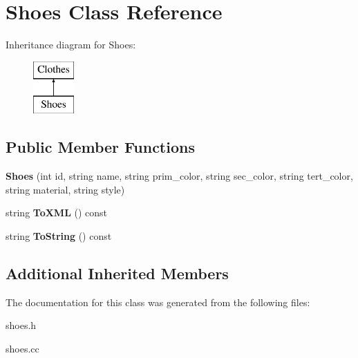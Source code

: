 \hypertarget{classShoes}{}\section{Shoes Class Reference}
\label{classShoes}
Inheritance diagram for Shoes\+:\begin{figure}[H]
\begin{center}
\leavevmode
\includegraphics[height=2.000000cm]{classShoes}
\end{center}
\end{figure}
\subsection*{Public Member Functions}
\begin{DoxyCompactItemize}
\item 
\mbox{\label{classShoes_a4f38fcd11c63cf3256c9688cf1bd19b3}} 
{\bfseries Shoes} (int id, string name, string prim\+\_\+color, string sec\+\_\+color, string tert\+\_\+color, string material, string style)
\item 
\mbox{\label{classShoes_acf6f049aa995a189b0f892f86defeefd}} 
string {\bfseries To\+X\+ML} () const
\item 
\mbox{\label{classShoes_a9b1bcc00ec7ef920d34bf9193c96a1ce}} 
string {\bfseries To\+String} () const
\end{DoxyCompactItemize}
\subsection*{Additional Inherited Members}


The documentation for this class was generated from the following files\+:\begin{DoxyCompactItemize}
\item 
shoes.\+h\item 
shoes.\+cc\end{DoxyCompactItemize}
